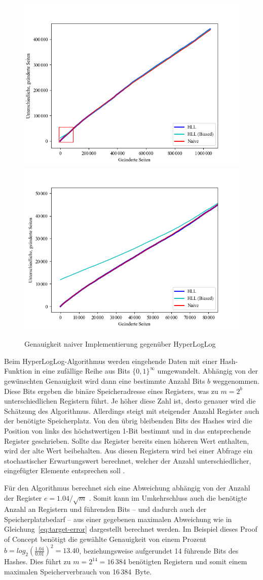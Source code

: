 \begin{figure}[b]
	\centering
	\includegraphics[width=.49\textwidth]{images/hll_count_1.png}
	\includegraphics[width=.49\textwidth]{images/hll_count_2.png}
	\caption{Genauigkeit naiver Implementierung gegenüber HyperLogLog}
	\label{fig:hll-count}
\end{figure}

Beim HyperLogLog-Algorithmus werden eingehende Daten mit einer Hash-Funktion in eine zufällige Reihe aus Bits $\{0, 1\}^\infty$ umgewandelt.
Abhängig von der gewünschten Genauigkeit wird dann eine bestimmte Anzahl Bits $b$ weggenommen.
Diese Bits ergeben die binäre Speicheradresse eines Registers, was zu $m=2^b$ unterschiedlichen Registern führt.
Je höher diese Zahl ist, desto genauer wird die Schätzung des Algorithmus.
Allerdings steigt mit steigender Anzahl Register auch der benötigte Speicherplatz.
Von den übrig bleibenden Bits des Hashes wird die Position von links des höchstwertigen 1-Bit bestimmt und in das entsprechende Register geschrieben.
Sollte das Register bereits einen höheren Wert enthalten, wird der alte Wert beibehalten.
Aus diesen Registern wird bei einer Abfrage ein stochastischer Erwartungswert berechnet, welcher der Anzahl unterschiedlicher, eingefügter Elemente entsprechen soll \cite{flajolet2007}.

Für den Algorithmus berechnet sich eine Abweichung abhängig von der Anzahl der Register $e=1.04/\sqrt{m}$ \cite{flajolet2007}.
Somit kann im Umkehrschluss auch die benötigte Anzahl an Registern und führenden Bits -- und dadurch auch der Speicherplatzbedarf -- aus einer gegebenen maximalen Abweichung wie in Gleichung~\eqref{eq:target-error} dargestellt berechnet werden.
Im Beispiel dieses Proof of Concept benötigt die gewählte Genauigkeit von einem Prozent $b = log_2 (\frac{1.04}{0.01})^2 = 13.40$, beziehungsweise aufgerundet 14 führende Bits des Hashes.
Dies führt zu $m = 2^{14} = 16\,384$ benötigten Registern und somit einem maximalen Speicherverbrauch von 16\,384~Byte.


